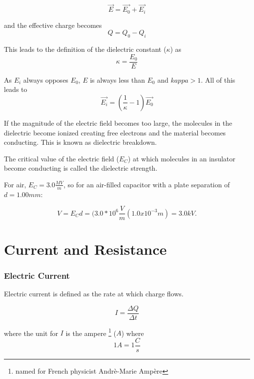 \documentclass[14pt]{memoir}
\begin{document}
\begin{equation}
\vec{E} = \vec{E_0} + \vec{E_i}
\end{equation}

and the effective charge becomes
\begin{equation}
Q = Q_0 - Q_i
\end{equation}

This leads to the definition of the dielectric constant ($\kappa$) as
\begin{equation}
\kappa = \frac{E_0}{E}
\end{equation}

As $E_i$ always opposes $E_0$, $E$ is always less than $E_0$ and $kappa > 1$. All of this leads to
\begin{equation}
\vec{E_i} = (\frac{1}{\kappa} - 1) \vec{E_0}
\end{equation}

If the magnitude of the electric field becomes too large, the molecules in the dielectric become ionized creating free electrons and the material becomes conducting. This is known as dielectric breakdown. 

The critical value of the electric field ($E_C$) at which molecules in an insulator become conducting is called the dielectric strength. 

For air, $E_C = 3.0 \frac{MV}{m}$, so for an air-filled capacitor with a plate separation of $d = 1.00mm$:

\begin{equation}
V = E_C d = (3.0 * 10^6 \frac{V}{m}(1.0 x 10^{-3}m) = 3.0 kV.
\end{equation}

\chapter{Current and Resistance}

\subsection{Electric Current}

Electric current is defined as the rate at which charge flows.

\begin{equation}
I = \frac{\Delta Q}{\Delta t}
\end{equation}

where the unit for $I$ is the ampere \footnote{named for French physicist Andr\`e-Marie Amp\`ere} ($A$) where 
\begin{equation}
1 A = 1 \frac{C}{s}
\end{equation}
\end{document}
